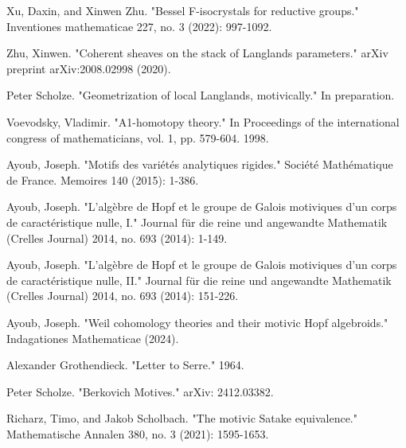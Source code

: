 \documentclass[12pt]{book}
\theoremstyle{definition}
\begin{document}
\begin{thebibliography}{}
 Xu, Daxin, and Xinwen Zhu. "Bessel F-isocrystals for reductive groups." Inventiones mathematicae 227, no. 3 (2022): 997-1092.

 Zhu, Xinwen. "Coherent sheaves on the stack of Langlands parameters." arXiv preprint arXiv:2008.02998 (2020).


 Peter Scholze. "Geometrization of local Langlands, motivically." In preparation.

 Voevodsky, Vladimir. "A1-homotopy theory." In Proceedings of the international congress of mathematicians, vol. 1, pp. 579-604. 1998.

 Ayoub, Joseph. "Motifs des vari\'et\'es analytiques rigides." Soci\'et\'e Math\'ematique de France. Memoires 140 (2015): 1-386.

 Ayoub, Joseph. "L'alg\`ebre de Hopf et le groupe de Galois motiviques d'un corps de caract\'eristique nulle, I." Journal f\"ur die reine und angewandte Mathematik (Crelles Journal) 2014, no. 693 (2014): 1-149.

 Ayoub, Joseph. "L'alg\`ebre de Hopf et le groupe de Galois motiviques d'un corps de caract\'eristique nulle, II." Journal f\"ur die reine und angewandte Mathematik (Crelles Journal) 2014, no. 693 (2014): 151-226.

 Ayoub, Joseph. "Weil cohomology theories and their motivic Hopf algebroids." Indagationes Mathematicae (2024).

 Alexander Grothendieck. "Letter to Serre." 1964.

 Peter Scholze. "Berkovich Motives." arXiv: 2412.03382.

 Richarz, Timo, and Jakob Scholbach. "The motivic Satake equivalence." Mathematische Annalen 380, no. 3 (2021): 1595-1653.






\end{thebibliography}
\end{document}
